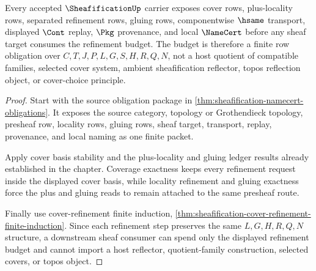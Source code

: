 \begin{theorem}
\label{thm:sheafification-cover-refinement-budget}
Every accepted $\SheafificationUp$ carrier exposes cover rows, plus-locality rows, separated refinement rows, gluing rows, componentwise $\hsame$ transport, displayed $\Cont$ replay, $\Pkg$ provenance, and local $\NameCert$ before any sheaf target consumes the refinement budget. The budget is therefore a finite row obligation over $C,T,J,P,L,G,S,H,R,Q,N$, not a host quotient of compatible families, selected cover system, ambient sheafification reflector, topos reflection object, or cover-choice principle.
\end{theorem}
\begin{proof}
Start with the source obligation package in \autoref{thm:sheafification-namecert-obligations}. It exposes the source category, topology or Grothendieck topology, presheaf row, locality rows, gluing rows, sheaf target, transport, replay, provenance, and local naming as one finite packet.

Apply cover basis stability and the plus-locality and gluing ledger results already established in the chapter. Coverage exactness keeps every refinement request inside the displayed cover basis, while locality refinement and gluing exactness force the plus and gluing reads to remain attached to the same presheaf route.

Finally use cover-refinement finite induction, \autoref{thm:sheafification-cover-refinement-finite-induction}. Since each refinement step preserves the same $L,G,H,R,Q,N$ structure, a downstream sheaf consumer can spend only the displayed refinement budget and cannot import a host reflector, quotient-family construction, selected covers, or topos object.
\end{proof}



